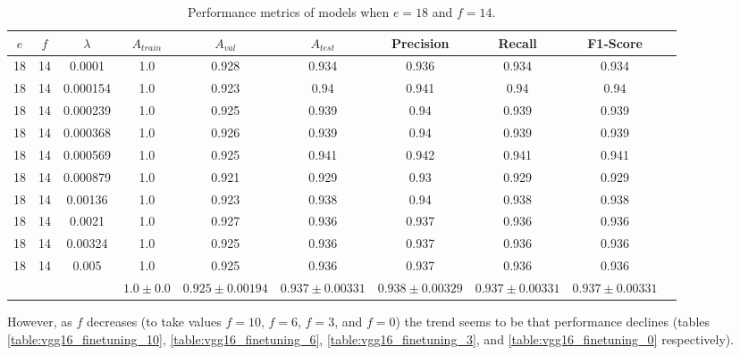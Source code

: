 \begin{table}[ht]
\centering
\begin{tabular}{ |c|c|c|c|c|c|c|c|c|c| }
\hline
$e$ & $f$ & $\lambda$ & $A_{train}$ & $A_{val}$ & $A_{test}$ & Precision & Recall & F1-Score \\
\hline
18 & 14 & 0.0001 & 1.0 & 0.928 & 0.934 & 0.936 & 0.934 & 0.934 \\
18 & 14 & 0.000154 & 1.0 & 0.923 & 0.94 & 0.941 & 0.94 & 0.94 \\
18 & 14 & 0.000239 & 1.0 & 0.925 & 0.939 & 0.94 & 0.939 & 0.939 \\
18 & 14 & 0.000368 & 1.0 & 0.926 & 0.939 & 0.94 & 0.939 & 0.939 \\
18 & 14 & 0.000569 & 1.0 & 0.925 & 0.941 & 0.942 & 0.941 & 0.941 \\
18 & 14 & 0.000879 & 1.0 & 0.921 & 0.929 & 0.93 & 0.929 & 0.929 \\
18 & 14 & 0.00136 & 1.0 & 0.923 & 0.938 & 0.94 & 0.938 & 0.938 \\
18 & 14 & 0.0021 & 1.0 & 0.927 & 0.936 & 0.937 & 0.936 & 0.936 \\
18 & 14 & 0.00324 & 1.0 & 0.925 & 0.936 & 0.937 & 0.936 & 0.936 \\
18 & 14 & 0.005 & 1.0 & 0.925 & 0.936 & 0.937 & 0.936 & 0.936 \\
\hline
 & & & $1.0\pm0.0$ & $0.925\pm0.00194$ & $0.937\pm0.00331$ & $0.938\pm0.00329$ & $0.937\pm0.00331$ & $0.937\pm0.00331$ \\
\hline
\end{tabular}
\caption{Performance metrics of models when $e = 18$ and $f = 14$.}
\label{table:vgg16_finetuning_14}
\end{table}

However, as $f$ decreases (to take values $f = 10$, $f = 6$, $f = 3$, and $f = 0$) the trend seems to be that performance declines (tables \ref{table:vgg16_finetuning_10}, \ref{table:vgg16_finetuning_6}, \ref{table:vgg16_finetuning_3}, and \ref{table:vgg16_finetuning_0} respectively).

